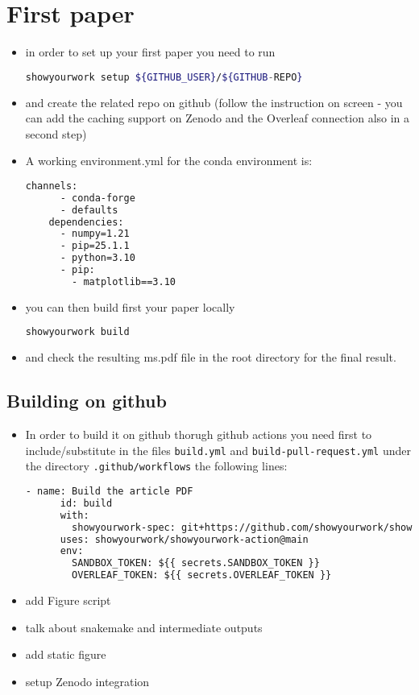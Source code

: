 \documentclass{aa}
\begin{document}
\section{First paper}
\begin{itemize}
\item in order to set up your first paper you need to run
  \begin{lstlisting}[language=bash]
    showyourwork setup ${GITHUB_USER}/${GITHUB-REPO}
  \end{lstlisting}
\item and create the related repo on github (follow the instruction on screen - you can add the caching support on Zenodo and the Overleaf connection also in a second step)
\item A working environment.yml for the conda environment is:
  \begin{lstlisting}[language=bash]
    channels:
      - conda-forge
      - defaults
    dependencies:
      - numpy=1.21
      - pip=25.1.1
      - python=3.10
      - pip:
        - matplotlib==3.10
  \end{lstlisting}
\item you can then build first your paper locally
  \begin{lstlisting}[language=bash]
    showyourwork build
  \end{lstlisting} 
\item and check the resulting ms.pdf file in the root directory for the final result.
\end{itemize}
\subsection{Building on github}
\begin{itemize}
\item In order to build it on github thorugh github actions you need first to include/substitute in the files \texttt{build.yml} and \texttt{build-pull-request.yml} under the directory \texttt{.github/workflows} the following lines:
  \begin{lstlisting}[language=xml]
    - name: Build the article PDF
      id: build
      with:
        showyourwork-spec: git+https://github.com/showyourwork/showyourwork
      uses: showyourwork/showyourwork-action@main
      env:
        SANDBOX_TOKEN: ${{ secrets.SANDBOX_TOKEN }}
        OVERLEAF_TOKEN: ${{ secrets.OVERLEAF_TOKEN }}
  \end{lstlisting}
\item add Figure script
\item talk about snakemake and intermediate outputs
\item add static figure
\item setup Zenodo integration
\end{itemize}
\end{document}
